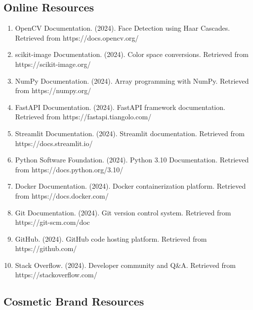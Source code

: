 \subsection*{Online Resources}

\begin{enumerate}[resume]

\item OpenCV Documentation. (2024). Face Detection using Haar Cascades. Retrieved from https://docs.opencv.org/

\item scikit-image Documentation. (2024). Color space conversions. Retrieved from https://scikit-image.org/

\item NumPy Documentation. (2024). Array programming with NumPy. Retrieved from https://numpy.org/

\item FastAPI Documentation. (2024). FastAPI framework documentation. Retrieved from https://fastapi.tiangolo.com/

\item Streamlit Documentation. (2024). Streamlit documentation. Retrieved from https://docs.streamlit.io/

\item Python Software Foundation. (2024). Python 3.10 Documentation. Retrieved from https://docs.python.org/3.10/

\item Docker Documentation. (2024). Docker containerization platform. Retrieved from https://docs.docker.com/

\item Git Documentation. (2024). Git version control system. Retrieved from https://git-scm.com/doc

\item GitHub. (2024). GitHub code hosting platform. Retrieved from https://github.com/

\item Stack Overflow. (2024). Developer community and Q\&A. Retrieved from https://stackoverflow.com/

\end{enumerate}

\subsection*{Cosmetic Brand Resources}

